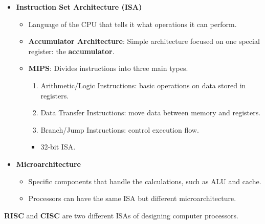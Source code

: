 \documentclass[12pt, letterpaper]{article}
\begin{document}
\begin{itemize}
    \item \textbf{Instruction Set Architecture (ISA)}
        \begin{itemize}
            \item Language of the CPU that tells it what operations it can perform.
            \item \textbf{Accumulator Architecture}: Simple architecture focused on one special register: the \textbf{accumulator}.
            \item \textbf{MIPS}: Divides instructions into three main types.
                \begin{enumerate}
                    \item Arithmetic/Logic Instructions: basic operations on data stored in registers.
                    \item Data Transfer Instructions: move data between memory and registers.
                    \item Branch/Jump Instructions: control execution flow.
                \end{enumerate}
                \begin{itemize}
                    \item 32-bit ISA.
                \end{itemize}
        \end{itemize}
    \item \textbf{Microarchitecture}
        \begin{itemize}
            \item Specific components that handle the calculations, such as ALU and cache.
            \item Processors can have the same ISA but different microarchitecture.
        \end{itemize}
\end{itemize}

\textbf{RISC} and \textbf{CISC} are two different ISAs of designing computer processors.
\end{document}
